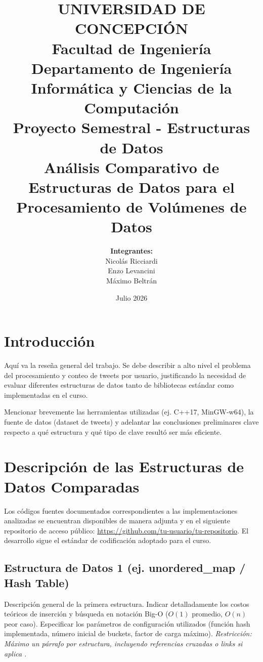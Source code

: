 \documentclass[11pt,letterpaper]{article}
\title{
    \small \textbf{UNIVERSIDAD DE CONCEPCIÓN}\\
    Facultad de Ingeniería\\
    Departamento de Ingeniería Informática y Ciencias de la Computación\\[1cm]
    \large Proyecto Semestral - Estructuras de Datos\\[0.5cm]
    \huge \textbf{Análisis Comparativo de Estructuras de Datos para el Procesamiento de Volúmenes de Datos}}
\author{
    \textbf{Integrantes:}\\
    Nicolás Ricciardi \\
    Enzo Levancini \\
    Máximo Beltrán
}
\date{Julio 2026}
\begin{document}
\maketitle
\thispagestyle{empty}
\newpage

\tableofcontents
\newpage

\section{Introducción}
\label{sec:introduccion}

Aquí va la reseña general del trabajo. Se debe describir a alto nivel el problema del procesamiento y conteo de tweets por usuario, justificando la necesidad de evaluar diferentes estructuras de datos tanto de bibliotecas estándar como implementadas en el curso. 

Mencionar brevemente las herramientas utilizadas (ej. C++17, MinGW-w64), la fuente de datos (dataset de tweets) y adelantar las conclusiones preliminares clave respecto a qué estructura y qué tipo de clave resultó ser más eficiente.


\section{Descripción de las Estructuras de Datos Comparadas}
\label{sec:estructuras}
Los códigos fuentes documentados correspondientes a las implementaciones analizadas se encuentran disponibles de manera adjunta y en el siguiente repositorio de acceso público: \url{https://github.com/tu-usuario/tu-repositorio}. El desarrollo sigue el estándar de codificación adoptado para el curso.

\subsection{Estructura de Datos 1 (ej. unordered\_map / Hash Table)}
Descripción general de la primera estructura. Indicar detalladamente los costos teóricos de inserción y búsqueda en notación Big-O ($O(1)$ promedio, $O(n)$ peor caso). Especificar los parámetros de configuración utilizados (función hash implementada, número inicial de buckets, factor de carga máximo). \textit{Restricción: Máximo un párrafo por estructura, incluyendo referencias cruzadas o links si aplica \cite{cormen2009}.}%
\end{document}
